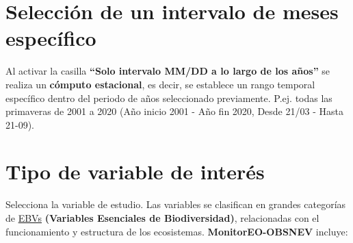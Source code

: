 \documentclass[
]{book}
\begin{document}
\chapter{Selección de un intervalo de meses específico}\label{periodo}

Al activar la casilla \textbf{``Solo intervalo MM/DD a lo largo de los años''} se realiza un \textbf{cómputo estacional}, es decir, se establece un rango temporal específico dentro del periodo de años seleccionado previamente. P.ej. todas las primaveras de 2001 a 2020 (Año inicio 2001 - Año fin 2020, Desde 21/03 - Hasta 21-09).

\chapter{Tipo de variable de interés}\label{tipo-variable}

Selecciona la variable de estudio. Las variables se clasifican en grandes categorías de \href{https://geobon.org/ebvs/what-are-ebvs/}{EBVs} \textbf{(Variables Esenciales de Biodiversidad)}, relacionadas con el funcionamiento y estructura de los ecosistemas. \textbf{MonitorEO-OBSNEV} incluye:
\end{document}
